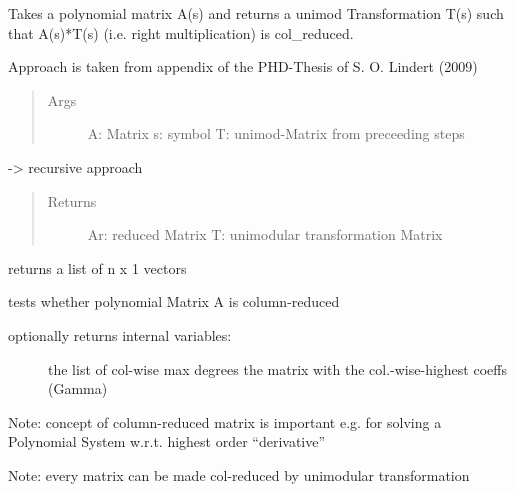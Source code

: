 \documentclass[letterpaper,10pt,english]{sphinxmanual}
\begin{document}
\begin{fulllineitems}
\label{pycontroltools:auxfuncs.math.matrix.get_col_reduced_right}
Takes a polynomial matrix A(s) and returns a unimod Transformation T(s)
such that   A(s)*T(s) (i.e. right multiplication) is col\_reduced.

Approach is taken from appendix of the PHD-Thesis of S. O. Lindert (2009)
\begin{quote}\begin{description}
\item[{Args}] \leavevmode
A:  Matrix
s:  symbol
T:  unimod-Matrix from preceeding steps

\end{description}\end{quote}

-\textgreater{} recursive approach
\begin{quote}\begin{description}
\item[{Returns}] \leavevmode
Ar: reduced Matrix
T:  unimodular transformation Matrix

\end{description}\end{quote}

\end{fulllineitems}


\begin{fulllineitems}
\label{pycontroltools:auxfuncs.math.matrix.get_rows}
returns a list of n x 1 vectors

\end{fulllineitems}


\begin{fulllineitems}
\label{pycontroltools:auxfuncs.math.matrix.is_col_reduced}
tests whether polynomial Matrix A is column-reduced
\begin{description}
\item[{optionally returns internal variables:}] \leavevmode
the list of col-wise max degrees
the matrix with the col.-wise-highest coeffs (Gamma)

\end{description}

Note: concept of column-reduced matrix is important e.g. for
solving a Polynomial System w.r.t. highest order ``derivative''

Note: every matrix can be made col-reduced by unimodular transformation

\end{fulllineitems}
\end{document}
